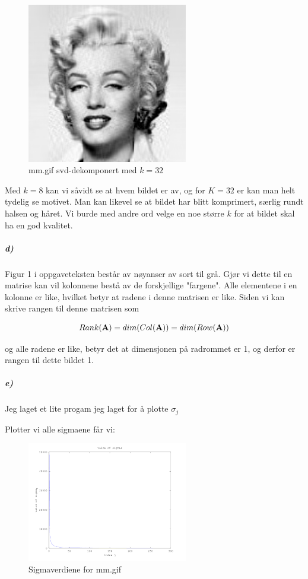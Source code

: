 \documentclass[a4paper,norsk, 10pt]{article}
\begin{document}
\begin{figure}[H]
\begin{center}
\includegraphics[width = 70mm]{k32.png}
\caption{mm.gif svd-dekomponert med $k=32$}
\end{center}
\end{figure}

Med $k = 8$ kan vi såvidt se at hvem bildet er av, og for $K=32$ er kan man helt tydelig se motivet. Man kan likevel se at bildet har blitt komprimert, særlig rundt halsen og håret. Vi burde med andre ord velge en noe større $k$ for at bildet skal ha en god kvalitet.

\subparagraph*{d)}

Figur 1 i oppgaveteksten består av nøyanser av sort til grå. Gjør vi dette til en matrise kan vil kolonnene bestå av de forskjellige "fargene". Alle elementene i en kolonne er like, hvilket betyr at radene i denne matrisen er like. Siden vi kan skrive rangen til denne matrisen som 

$$Rank(\bold{A}) = dim(Col(\bold{A})) = dim(Row(\bold{A}))$$

og alle radene er like, betyr det at dimensjonen på radrommet er 1, og derfor er rangen til dette bildet 1.

\subparagraph*{e)}

Jeg laget et lite progam jeg laget for å plotte $\sigma_j$



Plotter vi alle sigmaene får vi:

\begin{figure}[H]
\begin{center}
\includegraphics[width = 70mm]{sigmas.png}
\caption{Sigmaverdiene for mm.gif}
\end{center}
\end{figure}
\end{document}
